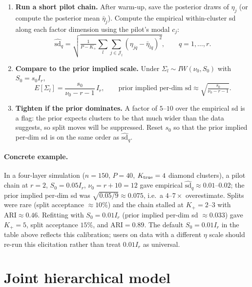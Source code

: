 \documentclass[11pt]{article}
\begin{document}
\begin{enumerate}[leftmargin=2em]
    \item \textbf{Run a short pilot chain.}  After warm-up, save the
    posterior draws of $\eta_j$ (or compute the posterior mean
    $\bar\eta_j$).  Compute the empirical within-cluster sd along each
    factor dimension using the pilot's modal $c_j$:
    \[
        \widehat{\mathrm{sd}}_q
        =\sqrt{\tfrac{1}{P-K_+}\sum_l\sum_{j\in\mathcal J_l}
        (\eta_{jq}-\bar\eta_{lq})^2},
        \qquad q=1,\dots,r.
    \]
    \item \textbf{Compare to the prior implied scale.}  Under
    $\Sigma_l\sim IW(\nu_0,S_0)$ with $S_0=s_0 I_r$,
    \[
        E[\Sigma_l]=\frac{s_0}{\nu_0-r-1}\,I_r,
        \qquad
        \text{prior implied per-dim sd}\approx\sqrt{\tfrac{s_0}{\nu_0-r-1}}.
    \]
    \item \textbf{Tighten if the prior dominates.}  A factor of $5$--$10$
    over the empirical sd is a flag: the prior expects clusters to be
    that much wider than the data suggests, so split moves will be
    suppressed.  Reset $s_0$ so that the prior implied per-dim sd is on
    the same order as $\widehat{\mathrm{sd}}_q$.
\end{enumerate}

\paragraph{Concrete example.}  In a four-layer simulation
($n=150$, $P=40$, $K_{\rm true}=4$ diamond clusters), a pilot chain at
$r=2$, $S_0=0.05I_r$, $\nu_0=r+10=12$ gave empirical
$\widehat{\mathrm{sd}}_q\approx 0.01$--$0.02$; the prior implied per-dim
sd was $\sqrt{0.05/9}\approx 0.075$, i.e.\ a $4$--$7\times$ overestimate.
Splits were rare (split acceptance $\approx 10\%$) and the chain stalled
at $K_+=2$--$3$ with $\mathrm{ARI}\approx 0.46$.  Refitting with
$S_0=0.01I_r$ (prior implied per-dim sd $\approx 0.033$) gave
$K_+=5$, split acceptance $15\%$, and $\mathrm{ARI}=0.89$.  The default
$S_0=0.01I_r$ in the table above reflects this calibration; users on
data with a different $\eta$ scale should re-run this elicitation rather
than treat $0.01I_r$ as universal.

\section{Joint hierarchical model}
\end{document}

